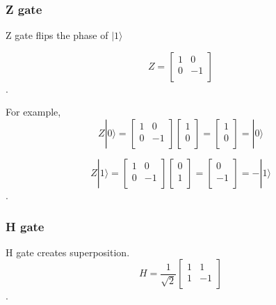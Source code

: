 \subsubsection{Z gate}

Z gate flips the phase of $ |1\rangle$

\begin{equation}
 Z = \begin{bmatrix}
1 & 0 \\
0 & -1 \\
\end{bmatrix}
\end{equation}.

For example,
\begin{equation}
 Z|0\rangle = \begin{bmatrix}
1 & 0 \\
0 & -1 \\
\end{bmatrix} 
\left[
\begin{array}{c}
1 \\
0 \\
\end{array}
\right]
= \left[
\begin{array}{c}
1 \\
0 \\
\end{array}
\right]
= |0\rangle
\end{equation}

\begin{equation}
Z|1\rangle = \begin{bmatrix}
1 & 0 \\
0 & -1 \\
\end{bmatrix} 
\left[
\begin{array}{c}
0 \\
1  \\
\end{array}
\right]
= \left[
\begin{array}{c}
0 \\
-1 \\
\end{array}
\right]
= -|1\rangle
\end{equation}.

\subsubsection{H gate}

H gate creates superposition.
\begin{equation}
 H = \frac{1}{\sqrt{2}}\begin{bmatrix}
1 & 1\\
1 & -1 \\
\end{bmatrix}
\end{equation}.

